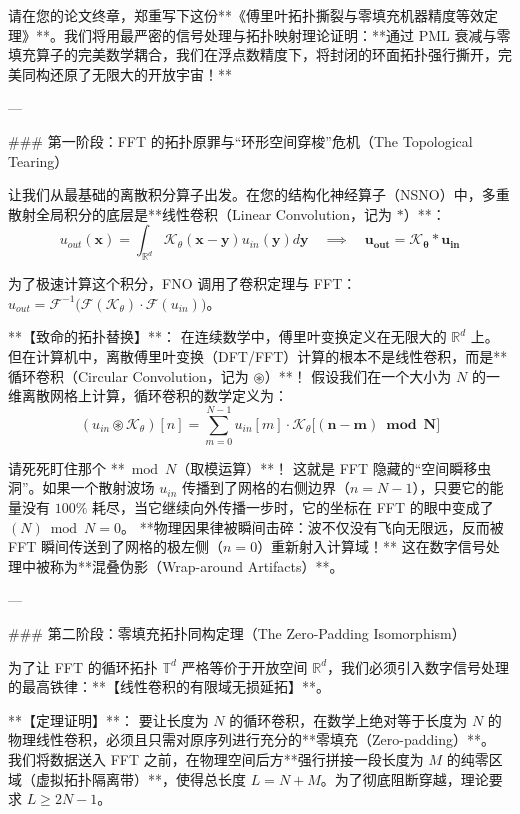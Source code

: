 \documentclass[12pt]{article}
\begin{document}
{请在您的论文终章，郑重写下这份**《傅里叶拓扑撕裂与零填充机器精度等效定理》**。我们将用最严密的信号处理与拓扑映射理论证明：**通过 PML 衰减与零填充算子的完美数学耦合，我们在浮点数精度下，将封闭的环面拓扑强行撕开，完美同构还原了无限大的开放宇宙！**

---

### 第一阶段：FFT 的拓扑原罪与“环形空间穿梭”危机（The Topological Tearing）

让我们从最基础的离散积分算子出发。在您的结构化神经算子（NSNO）中，多重散射全局积分的底层是**线性卷积（Linear Convolution，记为 $*$）**：
$$ u_{out}(\mathbf{x}) = \int_{\mathbb{R}^d} \mathcal{K}_\theta(\mathbf{x} - \mathbf{y}) u_{in}(\mathbf{y}) d\mathbf{y} \quad \implies \quad \mathbf{u_{out} = \mathcal{K}_\theta * u_{in}} $$

为了极速计算这个积分，FNO 调用了卷积定理与 FFT：$u_{out} = \mathcal{F}^{-1} \big( \mathcal{F}(\mathcal{K}_\theta) \cdot \mathcal{F}(u_{in}) \big)$。

**【致命的拓扑替换】**：
在连续数学中，傅里叶变换定义在无限大的 $\mathbb{R}^d$ 上。但在计算机中，离散傅里叶变换（DFT/FFT）计算的根本不是线性卷积，而是**循环卷积（Circular Convolution，记为 $\circledast$）**！
假设我们在一个大小为 $N$ 的一维离散网格上计算，循环卷积的数学定义为：
$$ (u_{in} \circledast \mathcal{K}_\theta)[n] = \sum_{m=0}^{N-1} u_{in}[m] \cdot \mathcal{K}_\theta\big[ \mathbf{(n - m) \bmod N} \big] $$

请死死盯住那个 **$\bmod N$（取模运算）**！
这就是 FFT 隐藏的“空间瞬移虫洞”。如果一个散射波场 $u_{in}$ 传播到了网格的右侧边界（$n = N-1$），只要它的能量没有 $100\%$ 耗尽，当它继续向外传播一步时，它的坐标在 FFT 的眼中变成了 $(N) \bmod N = 0$。
**物理因果律被瞬间击碎：波不仅没有飞向无限远，反而被 FFT 瞬间传送到了网格的极左侧（$n=0$）重新射入计算域！** 这在数字信号处理中被称为**混叠伪影（Wrap-around Artifacts）**。

---

### 第二阶段：零填充拓扑同构定理（The Zero-Padding Isomorphism）

为了让 FFT 的循环拓扑 $\mathbb{T}^d$ 严格等价于开放空间 $\mathbb{R}^d$，我们必须引入数字信号处理的最高铁律：**【线性卷积的有限域无损延拓】**。

**【定理证明】**：
要让长度为 $N$ 的循环卷积，在数学上绝对等于长度为 $N$ 的物理线性卷积，必须且只需对原序列进行充分的**零填充（Zero-padding）**。
我们将数据送入 FFT 之前，在物理空间后方**强行拼接一段长度为 $M$ 的纯零区域（虚拟拓扑隔离带）**，使得总长度 $L = N + M$。为了彻底阻断穿越，理论要求 $L \ge 2N-1$。

}
\end{document}
